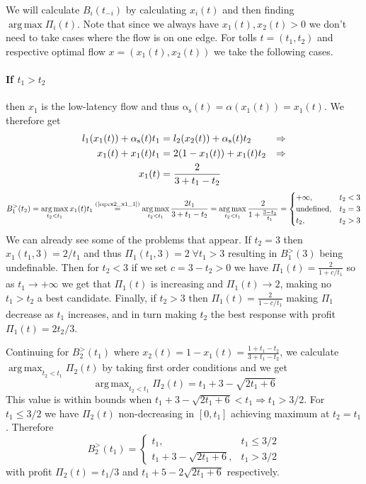 \documentclass[a4paper,11pt]{article}
\newcommand{\indeq}[1]{\stackrel{\text{#1}}{=}}
\newcommand{\as}{\mathrm{\alpha_s}}
\DeclareMathOperator*{\argmax}{arg\,max}
\begin{document}
We will calculate $B_i(t_{-i})$ by calculating $x_i(t)$ and then finding $\argmax \Pi_i(t)$.
Note that since we always have $x_1(t), x_2(t) > 0$ we don't need to take cases where the flow is on one edge.
For tolls $t = (t_1, t_2)$ and respective optimal flow $x = (x_1(t), x_2(t))$ we take the following cases.

\paragraph{If $t_1 > t_2$}
then $x_1$ is the low-latency flow and thus $\as(t) = \alpha(x_1(t)) = x_1(t)$.
We therefore get
\begin{align}
	l_1(x_1(t)) + \as(t) t_1 &= l_2(x_2(t)) + \as(t) t_2 &\Rightarrow \notag \\
	x_1(t) + x_1(t) t_1 &= 2 (1 - x_1(t)) + x_1(t) t_2 &\Rightarrow \notag \\
	x_1(t) &= \frac{2}{3 + t_1 - t_2} \label{eq:ex2_x1_1}
\end{align}
\[
	B_1^>(t_2) = \argmax_{t_2 < t_1} x_1(t) t_1 \indeq{(\ref{eq:ex2_x1_1})} \argmax_{t_2 < t_1} \frac{2 t_1}{3 + t_1 - t_2} = \argmax_{t_2 < t_1} \frac{2}{1 + \frac{3 - t_2}{t_1}} =
		\begin{cases}
			+\infty, & t_2 < 3 \\
			\textrm{undefined}, & t_2 = 3 \\
			t_2, & t_2 > 3 \\
		\end{cases}
\]
We can already see some of the problems that appear.
If $t_2 = 3$ then $x_1(t_1, 3) = 2/t_1$ and thus $\Pi_1(t_1, 3) = 2 \; \forall t_1 > 3$ resulting in $B_1^>(3)$ being undefinable.
Then for $t_2 < 3$ if we set $c = 3 - t_2 > 0$ we have $\Pi_1(t) = \frac{2}{1 + c/t_1}$ so as $t_1 \rightarrow +\infty$ we get that $\Pi_1(t)$ is increasing and $\Pi_1(t) \rightarrow 2$, making no $t_1 > t_2$ a best candidate.
Finally, if $t_2 > 3$ then $\Pi_1(t) = \frac{2}{1 - c/t_1}$ making $\Pi_1$ decrease as $t_1$ increases, and in turn making $t_2$ the best response with profit $\Pi_1(t) = {2 t_2}/3$.

Continuing for $B_2^>(t_1)$ where $x_2(t) = 1 - x_1(t) = \frac{1 + t_1 - t_2}{3 + t_1 - t_2}$, we calculate $\argmax_{t_2 < t_1} \Pi_2(t)$ by taking first order conditions and we get
\[\argmax_{t_2 < t_1} \Pi_2(t) = t_1 + 3 - \sqrt{2 t_1 + 6}\]
This value is within bounds when $t_1 + 3 - \sqrt{2 t_1 + 6} < t_1 \Rightarrow t_1 > 3/2$.
For $t_1 \le 3/2$ we have $\Pi_2(t)$ non-decreasing in $[0, t_1]$ achieving maximum at $t_2 = t_1$.
Therefore
\[
	B_2^>(t_1) =
		\begin{cases}
			t_1, & t_1 \le 3/2 \\
			t_1 + 3 - \sqrt{2 t_1 + 6}, & t_1 > 3/2
		\end{cases}
\]
with profit $\Pi_2(t) = t_1/3$ and $t_1 + 5 - 2 \sqrt{2 t_1 + 6}$ respectively.
\end{document}
